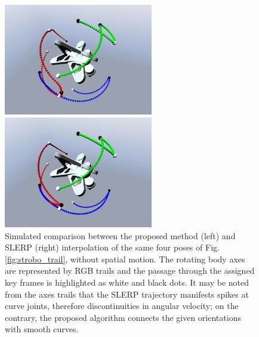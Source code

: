 \begin{figure}[tbp]
    \begin{minipage}[t]{0.49\textwidth}
        \centering
        \includegraphics[width=6.5cm]{figures/axes_trail_slerp.PNG}
    \end{minipage}
    \hfill
    \begin{minipage}[t]{0.49\textwidth}
        \centering
        \includegraphics[width=6.5cm]{figures/axes_trail_legnani.png}
    \end{minipage}
    \caption{Simulated comparison \cite{tasora2015chrono} between the proposed method (left) and SLERP (right) interpolation of the same four poses of Fig.\ref{fig:strobo_trail}, without spatial motion. The rotating body axes are represented by RGB trails and the passage through the assigned key frames is highlighted as white and black dots. It may be noted from the axes trails that the SLERP trajectory manifests spikes at curve joints, therefore discontinuities in angular velocity; on the contrary, the proposed algorithm connects the given orientations with smooth curves.}
    \label{fig:axes_trail}
\end{figure}

